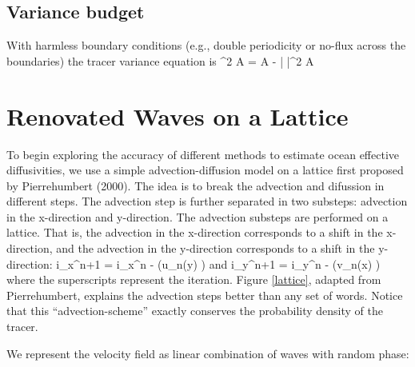 \documentclass[11pt]{article}
\newcommand{\So}{\mathcal{S}}
\newcommand{\bvth}{\bar{\vth}}
\begin{document}
\subsection{Variance budget}
With harmless boundary conditions (e.g., double periodicity or no-flux across the boundaries) the tracer variance
equation is
\beq
\label{varvth}
  \int \half \vth^2 \dd A = \int \vth \So \dd A - \kappa \int | \nabla \vth |^2 \dd A\per
\eeq
       



\section{Renovated Waves on a Lattice}

To begin exploring the accuracy of different methods to estimate ocean effective diffusivities,
we use a simple advection-diffusion model on a lattice first proposed by Pierrehumbert (2000).
The idea is to break the advection and difussion in different steps. The advection step is further
separated in two substeps: advection in the x-direction and y-direction. The advection substeps are
performed on a lattice. That is, the advection in the x-direction corresponds to a shift in the 
x-direction, and the advection in the y-direction corresponds to a shift in the y-direction:
\beq
i_x^{n+1} = i_x^{n} - \left(u_n(y) \dt \right)\com
\eeq
and
\beq
i_y^{n+1} = i_y^{n} - \left(v_n(x) \dt \right)\com
\eeq
where the superscripts represent the iteration. Figure \ref{lattice}, adapted from Pierrehumbert, explains the advection steps better than any set of words.
Notice that this ``advection-scheme'' exactly conserves the probability density of the tracer.

We represent the velocity field as linear combination of waves with random phase:
\end{document}
